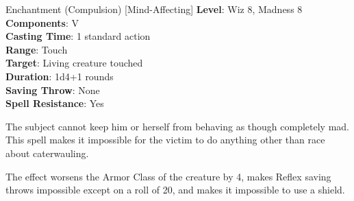 {Enchantment (Compulsion) [Mind-Affecting]}
{
	\textbf{Level}: Wiz 8, Madness 8\\
	\textbf{Components}: V\\
	\textbf{Casting Time}: 1 standard action\\
	\textbf{Range}: Touch\\
	\textbf{Target}: Living creature touched\\
	\textbf{Duration}: 1d4+1 rounds\\
	\textbf{Saving Throw}: None\\
	\textbf{Spell Resistance}: Yes\\
}
{
	The subject cannot keep him or herself from behaving as though completely mad. This spell makes it impossible for the victim to do anything other than race about caterwauling.

	The effect worsens the Armor Class of the creature by 4, makes Reflex saving throws impossible except on a roll of 20, and makes it impossible to use a shield.
}